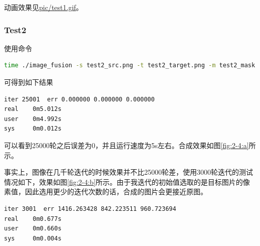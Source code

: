 \documentclass[a4paper]{article}
\begin{document}
动画效果见\underline{pic/test1.gif}。

\subsubsection{Test2}
使用命令
\begin{lstlisting}[language=bash]
time ./image_fusion -s test2_src.png -t test2_target.png -m test2_mask.png -o test2_result.png -i 25000 -h 150 -w 150
\end{lstlisting}
可得到如下结果
\begin{lstlisting}[language=bash]
iter 25001  err 0.000000 0.000000 0.000000
real    0m5.012s
user    0m4.992s
sys     0m0.012s
\end{lstlisting}

可以看到25000轮之后误差为0，并且运行速度为5s左右。合成效果如图\ref{fig:2-4:a}所示。

事实上，图像在几千轮迭代的时候效果并不比25000轮差，使用3000轮迭代的测试情况如下，效果如图\ref{fig:2-4:b}所示。由于我迭代的初始值选取的是目标图片的像素值，因此选用更少的迭代次数的话，合成的图片会更接近原图。

\begin{lstlisting}[language=bash]
iter 3001  err 1416.263428 842.223511 960.723694
real    0m0.677s
user    0m0.660s
sys     0m0.004s
\end{lstlisting}
\end{document}
